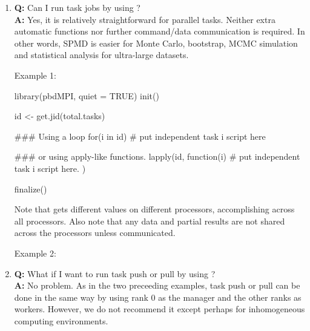 \begin{enumerate}
\item {\bf\color{blue} Q:}
      Can I run task jobs by using ? \\
      {\bf\color{blue} A:}
      Yes, it is relatively straightforward for parallel
      tasks. Neither extra automatic functions nor further
      command/data communication is required.  In other words, SPMD is
      easier for Monte Carlo, bootstrap, MCMC simulation and
      statistical analysis for ultra-large datasets.

Example 1:
\begin{Code}[title=SPMD R Script]
  library(pbdMPI, quiet = TRUE)
  init()

  id <- get.jid(total.tasks)

  ### Using a loop
  for(i in id){
    # put independent task i script here
  }

  ### or using apply-like functions.
  lapply(id, function(i){
    # put independent task i script here.
  })

  finalize()
\end{Code}

Note that  gets different values on different processors,
accomplishing  across all processors. Also note that
any data and partial results are not shared across the processors
unless communicated.

Example 2:

\item {\bf\color{blue} Q:}
      What if I want to run task push or pull by using ? \\
      {\bf\color{blue} A:}
      No problem. As in the two preceeding examples, task push or pull
      can be done in the same way by using rank 0 as the manager and
      the other ranks as workers. However, we do not recommend it
      except perhaps for inhomogeneous computing environments.


\end{enumerate}

